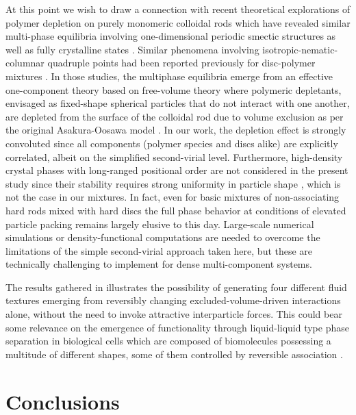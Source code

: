  At this point we wish to draw a connection with recent theoretical explorations of polymer depletion on purely monomeric colloidal rods which have revealed similar multi-phase equilibria involving one-dimensional periodic smectic structures as well as fully crystalline states \cite{peters_prl2020}. Similar phenomena involving isotropic-nematic-columnar quadruple points had been reported previously for disc-polymer mixtures \cite{gonzalez2017}. In those studies, the multiphase equilibria emerge from an effective one-component theory based on free-volume theory where   polymeric depletants, envisaged as fixed-shape spherical particles that do not interact with one another, are depleted from the surface of the colloidal rod due to volume exclusion as per the original Asakura-Oosawa model \cite{ASAKURA54,ASAKURA58,Vrijdepletie}. In our work, the depletion effect is strongly convoluted since all components (polymer species and discs alike) are explicitly correlated, albeit on the simplified second-virial level. Furthermore, high-density crystal phases with long-ranged positional order are not considered in the present study since their stability requires strong uniformity in particle shape \cite{mederos_overview2014}, which is not the case in our mixtures. In fact, even for basic mixtures of non-associating hard rods mixed with hard discs the full phase behavior at conditions of elevated particle packing  remains largely elusive to this day. Large-scale  numerical simulations or density-functional computations are needed  to overcome the limitations of the simple second-virial approach taken here, but these are technically challenging to implement for dense multi-component systems. 
 
 The results gathered in   illustrates the possibility of generating four different fluid textures emerging from reversibly changing excluded-volume-driven interactions alone, without the need to invoke attractive interparticle forces. This could bear some relevance on the emergence of functionality through liquid-liquid type phase separation in biological cells which are composed of biomolecules possessing a multitude of different shapes, some of them  controlled by reversible association \cite{hyman2014,shin2017}.

\section{Conclusions}

